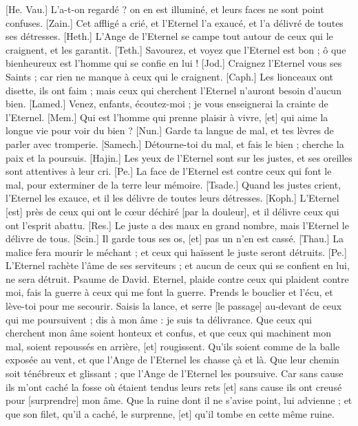 \begin{multicols}{2}
[He. Vau.] L'a-t-on regardé ? on en est illuminé, et leurs faces ne sont point confuses.
[Zain.] Cet affligé a crié, et l'Eternel l'a exaucé, et l'a délivré de toutes ses détresses.
[Heth.] L'Ange de l'Eternel se campe tout autour de ceux qui le craignent, et les garantit.
[Teth.] Savourez, et voyez que l'Eternel est bon ; ô que bienheureux est l'homme qui se confie en lui !
[Jod.] Craignez l'Eternel vous ses Saints ; car rien ne manque à ceux qui le craignent.
[Caph.] Les lionceaux ont disette, ils ont faim ; mais ceux qui cherchent l'Eternel n'auront besoin d'aucun bien.
[Lamed.] Venez, enfants, écoutez-moi ; je vous enseignerai la crainte de l'Eternel.
[Mem.] Qui est l'homme qui prenne plaisir à vivre, [et] qui aime la longue vie pour voir du bien ?
[Nun.] Garde ta langue de mal, et tes lèvres de parler avec tromperie.
[Samech.] Détourne-toi du mal, et fais le bien ; cherche la paix et la poursuis.
[Hajin.] Les yeux de l'Eternel sont sur les justes, et ses oreilles sont attentives à leur cri.
[Pe.] La face de l'Eternel est contre ceux qui font le mal, pour exterminer de la terre leur mémoire.
[Tsade.] Quand les justes crient, l'Eternel les exauce, et il les délivre de toutes leurs détresses.
[Koph.] L'Eternel [est] près de ceux qui ont le cœur déchiré [par la douleur], et il délivre ceux qui ont l'esprit abattu.
[Res.] Le juste a des maux en grand nombre, mais l'Eternel le délivre de tous.
[Scin.] Il garde tous ses os, [et] pas un n'en est cassé.
[Thau.] La malice fera mourir le méchant ; et ceux qui haïssent le juste seront détruits.
[Pe.] L'Eternel rachète l'âme de ses serviteurs ; et aucun de ceux qui se confient en lui, ne sera détruit.
\VerseOne{}Psaume de David. Eternel, plaide contre ceux qui plaident contre moi, fais la guerre à ceux qui me font la guerre.
Prends le bouclier et l'écu, et lève-toi pour me secourir.
Saisis la lance, et serre [le passage] au-devant de ceux qui me poursuivent ; dis à mon âme : je suis ta délivrance.
Que ceux qui cherchent mon âme soient honteux et confus, et que ceux qui machinent mon mal, soient repoussés en arrière, [et] rougissent.
Qu'ils soient comme de la balle exposée au vent, et que l'Ange de l'Eternel les chasse çà et là.
Que leur chemin soit ténébreux et glissant ; que l'Ange de l'Eternel les poursuive.
Car sans cause ils m'ont caché la fosse où étaient tendus leurs rets [et] sans cause ils ont creusé pour [surprendre] mon âme.
Que la ruine dont il ne s'avise point, lui advienne ; et que son filet, qu'il a caché, le surprenne, [et] qu'il tombe en cette même ruine.

\end{multicols}

